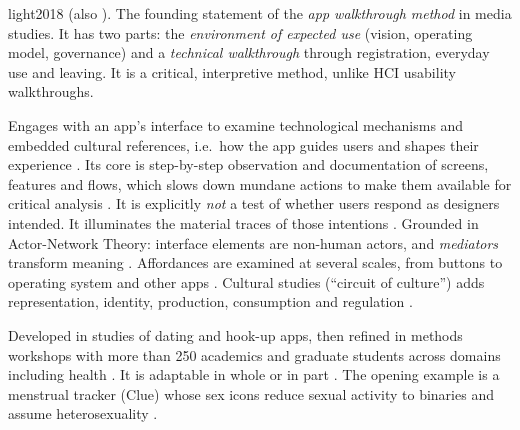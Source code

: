 \begin{papercard}{light2018}
   (also  ). The founding statement of the \emph{app walkthrough method} in media studies. It has two parts: the \emph{environment of expected use} (vision, operating model, governance) and a \emph{technical walkthrough} through registration, everyday use and leaving. It is a critical, interpretive method, unlike HCI usability walkthroughs.

 Engages with an app's interface to examine technological mechanisms and embedded cultural references, i.e.\ how the app guides users and shapes their experience . Its core is step-by-step observation and documentation of screens, features and flows, which slows down mundane actions to make them available for critical analysis . It is explicitly \emph{not} a test of whether users respond as designers intended. It illuminates the material traces of those intentions . Grounded in Actor-Network Theory: interface elements are non-human actors, and \emph{mediators} transform meaning . Affordances are examined at several scales, from buttons to operating system and other apps . Cultural studies (``circuit of culture'') adds representation, identity, production, consumption and regulation .

 Developed in studies of dating and hook-up apps, then refined in methods workshops with more than 250 academics and graduate students across domains including health . It is adaptable in whole or in part . The opening example is a menstrual tracker (Clue) whose sex icons reduce sexual activity to binaries and assume heterosexuality .


\end{papercard}
